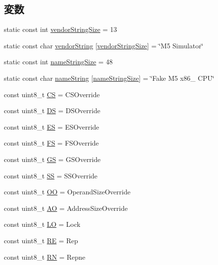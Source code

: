 \subsection*{変数}
\begin{DoxyCompactItemize}
\item 
static const int \hyperlink{namespaceX86ISA_a8e2753b68f307f094f0bb56a212b9daf}{vendorStringSize} = 13
\item 
static const char \hyperlink{namespaceX86ISA_afced94689148c5bcd7a361b9c40a46a2}{vendorString} \mbox{[}\hyperlink{namespaceX86ISA_a8e2753b68f307f094f0bb56a212b9daf}{vendorStringSize}\mbox{]} = \char`\"{}M5 Simulator\char`\"{}
\item 
static const int \hyperlink{namespaceX86ISA_a8e62af5576a372dc91c099b42e1541f4}{nameStringSize} = 48
\item 
static const char \hyperlink{namespaceX86ISA_a68b60896353bac8d836726b5902dfbe6}{nameString} \mbox{[}\hyperlink{namespaceX86ISA_a8e62af5576a372dc91c099b42e1541f4}{nameStringSize}\mbox{]} = \char`\"{}Fake M5 x86\_ CPU\char`\"{}
\item 
const uint8\_\-t \hyperlink{namespaceX86ISA_a72f9d36f4775bd1aedeea21730333e07}{CS} = CSOverride
\item 
const uint8\_\-t \hyperlink{namespaceX86ISA_ae9333134a9641c88d32b14331583b8ab}{DS} = DSOverride
\item 
const uint8\_\-t \hyperlink{namespaceX86ISA_ace9ea93d6ebfe71c30257d08302a61a0}{ES} = ESOverride
\item 
const uint8\_\-t \hyperlink{namespaceX86ISA_ad3fc35c4d63ba411ff46fd89a495a229}{FS} = FSOverride
\item 
const uint8\_\-t \hyperlink{namespaceX86ISA_a200aa1433f4177e2f2be519cf50eb30c}{GS} = GSOverride
\item 
const uint8\_\-t \hyperlink{namespaceX86ISA_acbe8412158c492ec8a596b58ad73b5d7}{SS} = SSOverride
\item 
const uint8\_\-t \hyperlink{namespaceX86ISA_aedb1e3f2b58889f97bb533d5c82981da}{OO} = OperandSizeOverride
\item 
const uint8\_\-t \hyperlink{namespaceX86ISA_a50db8efe7d4acc2cae436f1ecea8a664}{AO} = AddressSizeOverride
\item 
const uint8\_\-t \hyperlink{namespaceX86ISA_ac5a063d34932f7efd0fbd3c864b2511e}{LO} = Lock
\item 
const uint8\_\-t \hyperlink{namespaceX86ISA_a769b71b7ccb5f20709e7d3cf42f71463}{RE} = Rep
\item 
const uint8\_\-t \hyperlink{namespaceX86ISA_a66e737c817580b498d2ad105c801a744}{RN} = Repne

\end{DoxyCompactItemize}
